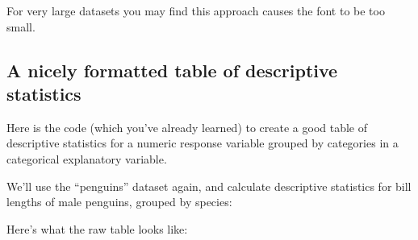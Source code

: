 \documentclass[
]{book}
\newenvironment{Shaded}{\begin{snugshade}}{\end{snugshade}}
\newcommand{\AttributeTok}[1]{\textcolor[rgb]{0.13,0.29,0.53}{#1}}
\newcommand{\ConstantTok}[1]{\textcolor[rgb]{0.56,0.35,0.01}{#1}}
\newcommand{\DecValTok}[1]{\textcolor[rgb]{0.00,0.00,0.81}{#1}}
\newcommand{\FloatTok}[1]{\textcolor[rgb]{0.00,0.00,0.81}{#1}}
\newcommand{\FunctionTok}[1]{\textcolor[rgb]{0.13,0.29,0.53}{\textbf{#1}}}
\newcommand{\NormalTok}[1]{#1}
\newcommand{\OtherTok}[1]{\textcolor[rgb]{0.56,0.35,0.01}{#1}}
\newcommand{\SpecialCharTok}[1]{\textcolor[rgb]{0.81,0.36,0.00}{\textbf{#1}}}
\newcommand{\StringTok}[1]{\textcolor[rgb]{0.31,0.60,0.02}{#1}}
\begin{document}
For very large datasets you may find this approach causes the font to be too small.

\subsection{A nicely formatted table of descriptive statistics}\label{stats_nicetable}

Here is the code (which you've already learned) to create a good table of descriptive statistics for a numeric response variable grouped by categories in a categorical explanatory variable.

We'll use the ``penguins'' dataset again, and calculate descriptive statistics for bill lengths of male penguins, grouped by species:

\begin{Shaded}
\end{Shaded}

Here's what the raw table looks like:
\end{document}
